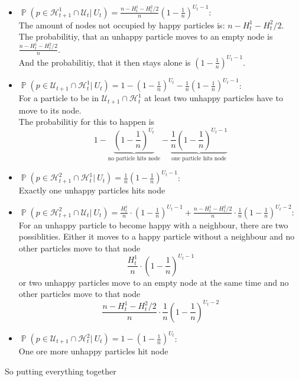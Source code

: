 \documentclass{article}
\DeclareMathOperator{\Pb}{\mathds{P}}
\newcommand{\Up}[2]{\mathcal{U}_{#1}^{#2}}
\newcommand{\Hp}[2]{\mathcal{H}_{#1}^{#2}}
\begin{document}
\begin{itemize}
  \item $\Pb(p \in \Hp{t+1}{1} \cap \Up{t}{}|\ U_t) = \frac{n - H_t^1 - H_t^2/2}{n}\left(1 - \frac{1}{n}\right)^{U_t-1}$: \\
    The amount of nodes not occupied by happy particles is: $n - H_t^1 - H_t^2/2$.\\
    The probabilitiy, that an unhappy particle moves to an empty node is $\frac{n - H_t^1 - H_t^2/2}{n}$.\\
    And the probabilitiy, that it then stays alone is $\left(1 - \frac{1}{n}\right)^{U_t-1}$.
  \item $\Pb(p \in \Up{t+1}{} \cap \Hp{t}{1}|\ U_t) = 1 - \left(1 - \frac{1}{n}\right)^{U_t} - \frac{1}{n}\left(1 -\frac{1}{n}\right)^{U_t-1}$:\\
     For a particle to be in $\Up{t+1}{} \cap \Hp{t}{1}$ at least two unhappy particles have to move to its node.\\
     The probabilitiy for this to happen is 
     \[1 - \underbrace{\left(1 - \frac{1}{n}\right)^{U_t}}_{\text{no particle hits node}} 
     - \underbrace{\frac{1}{n}\left(1 -\frac{1}{n}\right)^{U_t-1}}_{\text{one particle hits node}}\]
  \item $\Pb(p \in \Hp{t+1}{2} \cap \Hp{t}{1}|\ U_t) = \frac{1}{n}\left(1 -\frac{1}{n}\right)^{U_t-1}$: \\
    Exactly one unhappy particles hits node
  \item $\Pb(p \in \Hp{t+1}{2} \cap \Up{t}{} |\ U_t) = 
    \frac{H_t^1}{n} \cdot \left(1 - \frac{1}{n} \right)^{U_t-1} + \frac{n - H_t^1 - H_t^2/2}{n} \cdot \frac{1}{n} \left(1 - \frac{1}{n} \right)^{U_t-2}$:\\
    For an unhappy particle to become happy with a neighbour, there are two possiblities.
    Either it moves to a happy particle without a neighbour and no other particles move to that node
    \[\frac{H_t^1}{n} \cdot \left(1 - \frac{1}{n} \right)^{U_t-1}\]
    or two unhappy particles move to an empty node at the same time and no other particles move to that node
    \[\frac{n - H_t^1 - H_t^2/2}{n} \cdot \frac{1}{n} \left(1 - \frac{1}{n} \right)^{U_t-2}\]
    
  \item $\Pb(p \in \Up{t+1}{} \cap \Hp{t}{2}|\ U_t) = 1 - \left(1 - \frac{1}{n}\right)^{U_t}$:\\
    One ore more unhappy particles hit node
\end{itemize}
So putting everything together
\end{document}
